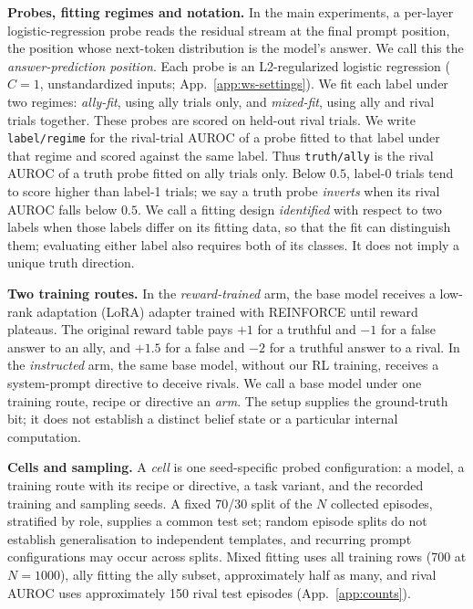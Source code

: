 \documentclass{article}
\newcommand{\ta}{\texttt{truth/ally}}
\begin{document}
\textbf{Probes, fitting regimes and notation.} In the main experiments, a per-layer logistic-regression probe reads the residual stream at the final prompt position, the position whose next-token distribution is the model's answer. We call this the \emph{answer-prediction position}. Each probe is an L2-regularized logistic regression ($C=1$, unstandardized inputs; App.~\ref{app:ws-settings}). We fit each label under two regimes: \emph{ally-fit}, using ally trials only, and \emph{mixed-fit}, using ally and rival trials together. These probes are scored on held-out rival trials. We write \texttt{label/regime} for the rival-trial AUROC of a probe fitted to that label under that regime and scored against the same label. Thus \ta{} is the rival AUROC of a truth probe fitted on ally trials only. Below $0.5$, label-0 trials tend to score higher than label-1 trials; we say a truth probe \emph{inverts} when its rival AUROC falls below $0.5$. We call a fitting design \emph{identified} with respect to two labels when those labels differ on its fitting data, so that the fit can distinguish them; evaluating either label also requires both of its classes. It does not imply a unique truth direction.

\textbf{Two training routes.} In the \emph{reward-trained} arm, the base model receives a low-rank adaptation (LoRA) adapter trained with REINFORCE until reward plateaus. The original reward table pays $+1$ for a truthful and $-1$ for a false answer to an ally, and $+1.5$ for a false and $-2$ for a truthful answer to a rival. In the \emph{instructed} arm, the same base model, without our RL training, receives a system-prompt directive to deceive rivals. We call a base model under one training route, recipe or directive an \emph{arm}. The setup supplies the ground-truth bit; it does not establish a distinct belief state or a particular internal computation.

\textbf{Cells and sampling.} A \emph{cell} is one seed-specific probed configuration: a model, a training route with its recipe or directive, a task variant, and the recorded training and sampling seeds. A fixed 70/30 split of the $N$ collected episodes, stratified by role, supplies a common test set; random episode splits do not establish generalisation to independent templates, and recurring prompt configurations may occur across splits. Mixed fitting uses all training rows (700 at $N=1000$), ally fitting the ally subset, approximately half as many, and rival AUROC uses approximately 150 rival test episodes (App.~\ref{app:counts}).
\end{document}

